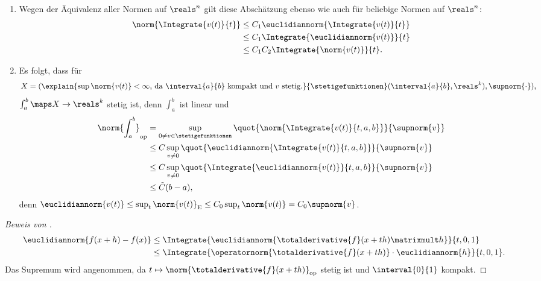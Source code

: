 \begin{bemerkungen*}
    \begin{enumerate}
        \item Wegen der Äquivalenz aller Normen auf \( \reals^n \) gilt diese Abschätzung ebenso wie  auch für beliebige Normen auf \( \reals^n \):
        \begin{equation*}
            \begin{split}
                \norm{\Integrate{v(t)}{t}}&\leq C_1\euclidiannorm{\Integrate{v(t)}{t}}\\
                &\leq C_1\Integrate{\euclidiannorm{v(t)}}{t}\\
                &\leq C_1 C_2 \Integrate{\norm{v(t)}}{t}.
            \end{split}
        \end{equation*}
        \item Es folgt, dass für
        \begin{equation*}
            X=(\explain{\sup\norm{v(t)}<\infty \text{, da \( \interval{a}{b} \) kompakt und \( v \) stetig.}}{\stetigefunktionen}(\interval{a}{b},\reals^k),\supnorm{\cdot}),
        \end{equation*}
        \( \int_a^b\maps X\to \reals^k \) stetig ist, denn \( \int_a^b \) ist linear und
        \begin{equation*}
            \begin{split}
                \norm{\int_a^b}_{\text{op}}&=\sup_{0\neq v \in \stetigefunktionen}\quot{\norm{\Integrate{v(t)}{t,a,b}}}{\supnorm{v}}\\
                &\leq C\sup_{v\neq 0}\quot{\euclidiannorm{\Integrate{v(t)}{t,a,b}}}{\supnorm{v}}\\
                &\leq C\sup_{v\neq 0}\quot{\Integrate{\euclidiannorm{v(t)}}{t,a,b}}{\supnorm{v}}\\
                &\leq \tilde{C}(b-a),
            \end{split}
        \end{equation*}
        denn \( \euclidiannorm{v(t)}\leq \sup_{t}\norm{v(t)}_\text{E}\leq C_0\sup_t\norm{v(t)}=C_0\supnorm{v} \).
    \end{enumerate}
\end{bemerkungen*}
\begin{proof}[Beweis von ]
    \begin{equation*}
        \begin{split}
            \euclidiannorm{f(x+h)-f(x)}&\leq \Integrate{\euclidiannorm{\totalderivative{f}(x+th)\matrixmult h}}{t,0,1}\\
            &\leq \Integrate{\operatornorm{\totalderivative{f}(x+th)}\cdot \euclidiannorm{h}}{t,0,1}.
        \end{split}
    \end{equation*}
    Das Supremum wird angenommen, da \( t\mapsto \norm{\totalderivative{f}(x+th)}_{\text{op}} \) stetig ist und \( \interval{0}{1} \) kompakt.
\end{proof}
